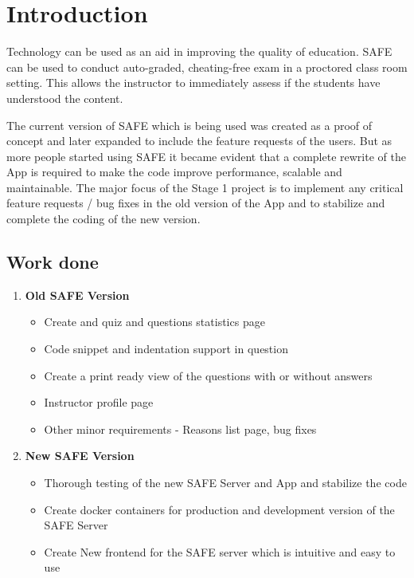 \clearpage
\section{Introduction} 
\hspace{0.5cm} 
  
Technology can be used as an aid in improving the quality of education. SAFE can be used to conduct auto-graded, cheating-free exam in a proctored class room setting. This allows the instructor to immediately assess if the students have understood the content.

The current version of SAFE which is being used was created as a proof of concept and later expanded to include the feature requests of the users. But as more people started using SAFE it became evident that a complete rewrite of the App is required to make the code improve performance, scalable and maintainable. The major focus of the Stage 1 project is to implement any critical feature requests / bug fixes in the old version of the App and to stabilize and complete the coding of the new version.
   
\subsection{Work done}

\begin{enumerate}
 
 \item \textbf{Old SAFE Version}
 \begin{itemize}
  \item Create and quiz and questions statistics page
  \item Code snippet and indentation support in question
  \item Create a print ready view of the questions with or without answers
  \item Instructor profile page
  \item Other minor requirements - Reasons list page, bug fixes
  
 \end{itemize}

 \item \textbf{New SAFE Version}
 \begin{itemize}
  \item Thorough testing of the new SAFE Server and App and stabilize the code
  \item Create docker containers for production and development version of the SAFE Server
  \item Create New frontend for the SAFE server which is intuitive and easy to use
 \end{itemize}

\end{enumerate}